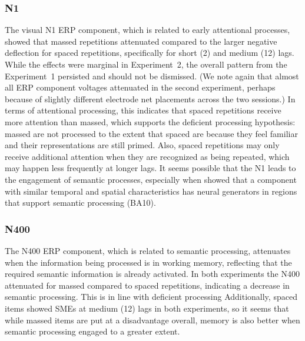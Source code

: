 

\subsubsection{N1}


The visual N1 ERP component, which is related to early attentional processes, showed that massed repetitions attenuated compared to the larger negative deflection for spaced repetitions, specifically for short (2) and medium (12) lags.  While the effects were marginal in Experiment~2, the overall pattern from the Experiment~1 persisted and should not be dismissed. (We note again that almost all ERP component voltages attenuated in the second experiment, perhaps because of slightly different electrode net placements across the two sessions.)  In terms of attentional processing, this indicates that spaced repetitions receive more attention than massed, which supports the deficient processing hypothesis: massed are not processed to the extent that spaced are because they feel familiar and their representations are still primed.  Also, spaced repetitions may only receive additional attention when they are recognized as being repeated, which may happen less frequently at longer lags.  It seems possible that the N1 leads to the engagement of semantic processes, especially when  showed that a component with similar temporal and spatial characteristics has neural generators in regions that support semantic processing (BA10).

\subsubsection{N400}


The N400 ERP component, which is related to semantic processing, attenuates when the information being processed is in working memory, reflecting that the required semantic information is already activated.  In both experiments the N400 attenuated for massed compared to spaced repetitions, indicating a decrease in semantic processing.  This is in line with deficient processing 
Additionally, spaced items showed SMEs at medium (12) lags in both experiments, so it seems that while massed items are put at a disadvantage overall, memory is also better when semantic processing engaged to a greater extent.

